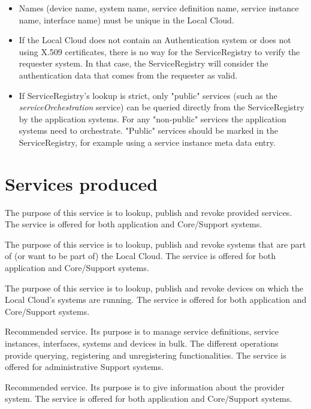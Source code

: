\documentclass[a4paper]{arrowhead}
\begin{document}
\begin{itemize}
    \item Names (device name, system name, service definition name, service instance name, interface name) must be unique in the Local Cloud.
    \item If the Local Cloud does not contain an Authentication system or does not using X.509 certificates, there is no way for the ServiceRegistry to verify the requester system. In that case, the ServiceRegistry will consider the authentication data that comes from the requester as valid.
    \item If ServiceRegistry's lookup is strict, only "public" services (such as the \textit{serviceOrchestration} service) can be queried directly from the ServiceRegistry by the application systems. For any "non-public" services the application systems need to orchestrate. "Public" services should be marked in the ServiceRegistry, for example using a service instance meta data entry.
\end{itemize}

\newpage

\section{Services produced}
\label{sec:services}

{}
The purpose of this service is to lookup, publish and revoke provided services. The service is offered for both application and Core/Support systems. 

The purpose of this service is to lookup, publish and revoke systems that are part of (or want to be part of) the Local Cloud. The service is offered for both application and Core/Support systems. 

The purpose of this service is to lookup, publish and revoke devices on which the Local Cloud's systems are running. The service is offered for both application and Core/Support systems. 

Recommended service.  Its purpose is to manage service definitions, service instances, interfaces, systems and devices in bulk. The different operations provide querying, registering and unregistering functionalities. The service is offered for administrative Support systems. 

Recommended service. Its purpose is to give information about the provider system. The service is offered for both application and Core/Support systems.
\end{document}
